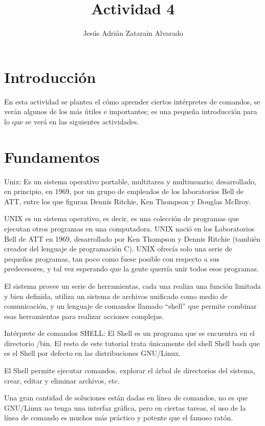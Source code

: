 \documentclass{article}
\title{Actividad 4}
\author{Jesús Adrián Zatarain Alvarado}
\begin{document}
\maketitle

\section{Introducción}

En esta actividad se plantea el cómo aprender ciertos intérpretes de comandos, se verán algunos de los más útiles e importantes; es una pequeña introducción para lo que se verá en las siguientes actividades.

\section{Fundamentos}

Unix:
Es un sistema operativo portable, multitarea y multiusuario; desarrollado, en principio, en 1969, por un grupo de empleados de los laboratorios Bell de ATT, entre los que figuran Dennis Ritchie, Ken Thompson y Douglas McIlroy.

UNIX es un sistema operativo, es decir, es una colección de programas que ejecutan otros programas en una computadora. UNIX nació en los Laboratorios Bell de ATT en 1969, desarrollado por Ken Thompson y Dennis Ritchie (también creador del lenguaje de programación C). UNIX ofrecía solo una serie de pequeños programas, tan poco como fuese posible con respecto a sus predecesores, y tal vez esperando que la gente querría unir todos esos programas.

El sistema provee un serie de herramientas, cada una realiza una función limitada y bien definida, utiliza un sistema de archivos unificado como medio de comunicación, y un lenguaje de comandos llamado “shell” que permite combinar esas herramientas para realizar acciones complejas.

Intérprete de comandos SHELL:
El Shell es un programa que se encuentra en el directorio /bin. El resto de este tutorial trata únicamente del shell Shell bash que es el Shell por defecto en las distribuciones GNU/Linux.

El Shell permite ejecutar comandos, explorar el árbol de directorios del sistema, crear, editar y eliminar archivos, etc.

Una gran cantidad de soluciones están dadas en línea de comandos, no es que GNU/Linux no tenga una interfaz gráfica, pero en ciertas tareas, el uso de la línea de comando es muchos más práctico y potente que el famoso ratón.
\end{document}
